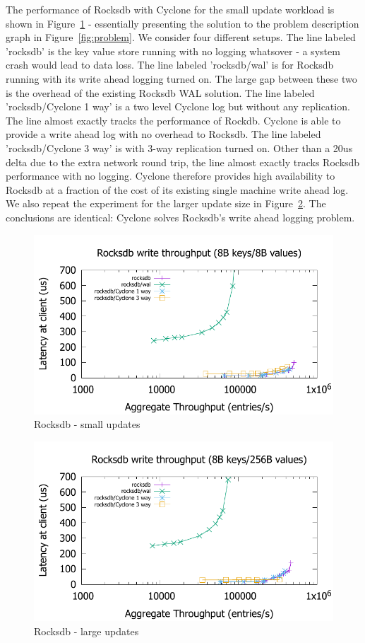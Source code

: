 \documentclass[pageno]{jpaper}
\begin{document}
The performance of Rocksdb with Cyclone for the small update workload is shown
in Figure~\ref{fig:rocksdb} - essentially presenting the solution to the problem
description graph in Figure~\ref{fig:problem}.  We consider four different
setups. The line labeled 'rocksdb' is the key value store running with no
logging whatsover - a system crash would lead to data loss. The line labeled
'rocksdb/wal' is for Rocksdb running with its write ahead logging turned on. The
large gap between these two is the overhead of the existing Rocksdb WAL
solution. The line labeled 'rocksdb/Cyclone 1 way' is a two level Cyclone log
but without any replication. The line almost exactly tracks the performance of
Rockdb. Cyclone is able to provide a write ahead log with no overhead to
Rocksdb. The line labeled 'rocksdb/Cyclone 3 way' is with 3-way replication
turned on. Other than a 20us delta due to the extra network round trip, the line
almost exactly tracks Rocksdb performance with no logging. Cyclone therefore
provides high availability to Rocksdb at a fraction of the cost of its existing
single machine write ahead log. We also repeat the experiment for the larger
update size in Figure~\ref{fig:rocksdb_256}. The conclusions are identical:
Cyclone solves Rocksdb's write ahead logging problem.

\begin{figure}
\includegraphics[scale=0.6]{results2/rocksdb.pdf}
\caption{Rocksdb - small updates}
\label{fig:rocksdb}
\end{figure}

\begin{figure}
\includegraphics[scale=0.6]{results2/rocksdb_256.pdf}
\caption{Rocksdb - large updates}
\label{fig:rocksdb_256}
\end{figure}
\end{document}
